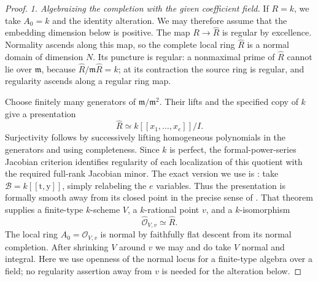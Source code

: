 \begin{proof}
\emph{1. Algebraizing the completion with the given coefficient field.}
If $R=k$, we take $A_0=k$ and the identity alteration.
We may therefore assume that the embedding dimension below is positive.
The map $R\to\widehat R$ is regular by excellence.
Normality ascends along this map, so the complete local ring
$\widehat R$ is a normal domain of dimension $N$.
Its puncture is regular: a nonmaximal prime of $\widehat R$
cannot lie over $\mathfrak m$, because
$\widehat R/\mathfrak m\widehat R=k$; at its contraction
the source ring is regular, and regularity ascends along
a regular ring map.

Choose finitely many generators of $\mathfrak m/\mathfrak m^2$.
Their lifts and the specified copy of $k$ give a presentation
\[
             \widehat R\simeq k[[x_1,\ldots,x_e]]/I.
\]
Surjectivity follows by successively lifting homogeneous
polynomials in the generators and using completeness.
Since $k$ is perfect, the formal-power-series Jacobian
criterion identifies regularity of each localization of
this quotient with the required full-rank Jacobian minor.
The exact version we use is
\citet[Proposition 2.5, with the definition of $\mathcal B$
in Section 2]{rootHauserWoblistin2021}: take
$\mathcal B=k[[\mathrm t,\mathrm y]]$, simply relabeling
the $e$ variables. Thus the presentation is formally
smooth away from its closed point in the precise sense
of \citet[Theorem 3.8, p.~32]{rootArtin1969}.
That theorem supplies a finite-type $k$-scheme $V$, a
$k$-rational point $v$, and a $k$-isomorphism
\begin{equation}\label{eq:C3z-formal-algebraization}
                  \widehat{\mathcal O}_{V,v}\simeq\widehat R.
\end{equation}
The local ring $A_0=\mathcal O_{V,v}$ is normal by
faithfully flat descent from its normal completion.
After shrinking $V$ around $v$ we may and do take $V$
normal and integral. Here we use openness of the normal
locus for a finite-type algebra over a field; no
regularity assertion away from $v$ is needed for the
alteration below.


\end{proof}
